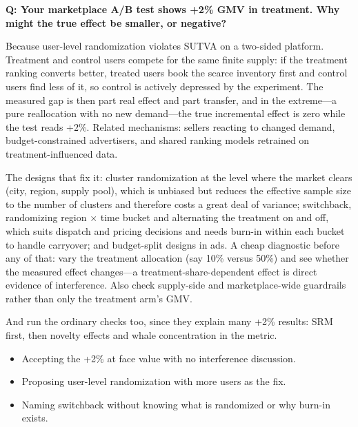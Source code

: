 \begin{interviewq}
\textbf{Q: Your marketplace A/B test shows +2\% GMV in treatment. Why might the true effect be smaller, or negative?}

 \quad {} \quad \badgefreq{\freqhigh}

\stronganswer

Because user-level randomization violates SUTVA on a two-sided platform. Treatment and control users compete for the same finite supply: if the treatment ranking converts better, treated users book the scarce inventory first and control users find less of it, so control is actively depressed by the experiment. The measured gap is then part real effect and part transfer, and in the extreme---a pure reallocation with no new demand---the true incremental effect is zero while the test reads +2\%. Related mechanisms: sellers reacting to changed demand, budget-constrained advertisers, and shared ranking models retrained on treatment-influenced data.

The designs that fix it: cluster randomization at the level where the market clears (city, region, supply pool), which is unbiased but reduces the effective sample size to the number of clusters and therefore costs a great deal of variance; switchback, randomizing region $\times$ time bucket and alternating the treatment on and off, which suits dispatch and pricing decisions and needs burn-in within each bucket to handle carryover; and budget-split designs in ads. A cheap diagnostic before any of that: vary the treatment allocation (say 10\% versus 50\%) and see whether the measured effect changes---a treatment-share-dependent effect is direct evidence of interference. Also check supply-side and marketplace-wide guardrails rather than only the treatment arm's GMV.

And run the ordinary checks too, since they explain many +2\% results: SRM first, then novelty effects and whale concentration in the metric.

\redflags
\begin{itemize}
    \item Accepting the +2\% at face value with no interference discussion.
    \item Proposing user-level randomization with more users as the fix.
    \item Naming switchback without knowing what is randomized or why burn-in exists.
\end{itemize}



\end{interviewq}
